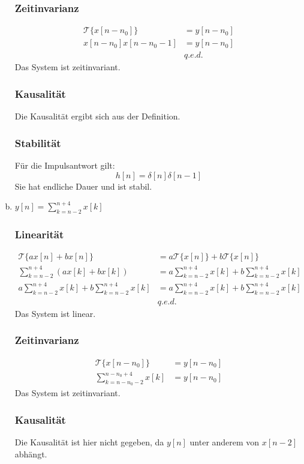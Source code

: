\begin{enumerate}[a)]
	\subsubsection*{Zeitinvarianz}
		\begin{align*}
			\mathcal{T} \{ x[n-n_0] \} &= y[n-n_0] \\
			x[n-n_0]x[n-n_0-1] &= y[n-n_0] \\
			&q.e.d.
		\end{align*}
	 	Das System ist zeitinvariant.
 	\subsubsection*{Kausalität}
	 Die Kausalität ergibt sich aus der Definition. 
	\subsubsection*{Stabilität}
	 Für die Impulsantwort gilt:
	 \[
	 	h[n] = \delta [n] \delta[n-1]
	 \]
	 Sie hat endliche Dauer und ist stabil.
	\item $\displaystyle{y[n] = \sum_{k=n-2}^{n+4}x[k]}$
	\subsubsection*{Linearität}
		\begin{align*}
			\mathcal{T} \{ ax[n] + bx[n] \} &= a\mathcal{T} \{ x[n] \} + b \mathcal{T} \{ x[n] \} \\
			\sum_{k=n-2}^{n+4}(ax[k]+bx[k]) &= a\sum_{k=n-2}^{n+4}x[k]+b\sum_{k=n-2}^{n+4}x[k] \\
			a\sum_{k=n-2}^{n+4}x[k]+b\sum_{k=n-2}^{n+4}x[k] &= a\sum_{k=n-2}^{n+4}x[k]+b\sum_{k=n-2}^{n+4}x[k] \\
			&q.e.d.
		\end{align*}
		Das System ist linear.
	\subsubsection*{Zeitinvarianz}
		\begin{align*}
			\mathcal{T} \{ x[n-n_0] \} &= y[n-n_0] \\
			\sum_{k=n-n_0-2}^{n-n_0+4}x[k] &= y[n-n_0]
		\end{align*}
		Das System ist zeitinvariant.
	\subsubsection*{Kausalität}
		Die Kausalität ist hier nicht gegeben, da $y[n]$ unter anderem von $x[n-2]$ abhängt.

\end{enumerate}
